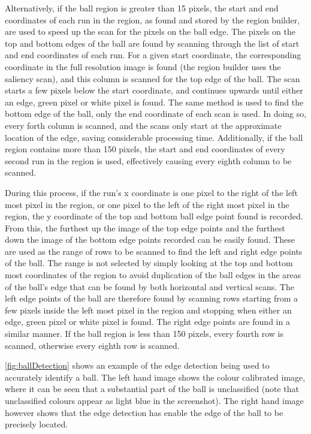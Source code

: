 \documentclass[pdftex,11pt,a4paper]{report}
\begin{document}
Alternatively, if the ball region is greater than 15 pixels, the start and end coordinates of each run in the region, as found and stored by the region builder, are used to speed up the scan for the pixels on the ball edge. The pixels on the top and bottom edges of the ball are found by scanning through the list of start and end coordinates of each run. For a given start coordinate, the corresponding coordinate in the full resolution image is found (the region builder uses the saliency scan), and this column is scanned for the top edge of the ball. The scan starts a few pixels below the start coordinate, and continues upwards until either an edge, green pixel or white pixel is found. The same method is used to find the bottom edge of the ball, only the end coordinate of each scan is used. In doing so, every forth column is scanned, and the scans only start at the approximate location of the edge, saving considerable processing time. Additionally, if the ball region contains more than 150 pixels, the start and end coordinates of every second run in the region is used, effectively causing every eighth column to be scanned. 

During this process, if the run's x coordinate is one pixel to the right of the left most pixel in the region, or one pixel to the left of the right most pixel in the region, the y coordinate of the top and bottom ball edge point found is recorded. From this, the furthest up the image of the top edge points and the furthest down the image of the bottom edge points recorded can be easily found. These are used as the range of rows to be scanned to find the left and right edge points of the ball. The range is not selected by simply looking at the top and bottom most coordinates of the region to avoid duplication of the ball edges in the areas of the ball's edge that can be found by both horizontal and vertical scans. The left edge points of the ball are therefore found by scanning rows starting from a few pixels inside the left most pixel in the region and stopping when either an edge, green pixel or white pixel is found. The right edge points are found in a similar manner. If the ball region is less than 150 pixels, every fourth row is scanned, otherwise every eighth row is scanned.

\autoref{fig:ballDetection} shows an example of the edge detection being used to accurately identify a ball. The left hand image shows the colour calibrated image, where it can be seen that a substantial part of the ball is unclassified (note that unclassified colours appear as light blue in the screenshot). The right hand image however shows that the edge detection has enable the edge of the ball to be precisely located.
\end{document}
